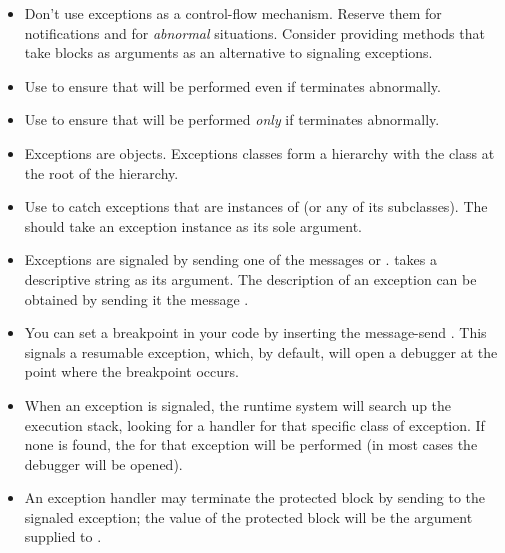 \documentclass[a4paper,10pt,twoside]{book}
\begin{document}
\begin{itemize}
\item Don't use exceptions as a control-flow mechanism.  Reserve them for notifications and for \emph{abnormal} situations.  Consider providing methods that take blocks as arguments as an alternative to signaling exceptions.

\item Use  to ensure that  will be performed even if  terminates abnormally.

\item Use  to ensure that  will be performed \emph{only} if  terminates abnormally.

\item Exceptions are objects. Exceptions classes form a hierarchy with the class  at the root of the hierarchy.

\item Use  to catch exceptions that are instances of  (or any of its subclasses). The  should take an exception instance as its sole argument.

\item Exceptions are signaled by sending one of the messages  or .  takes a descriptive string as its argument. The description of an exception can be obtained by sending it the message .

\item You can set a breakpoint in your code by inserting the message-send . This signals a resumable  exception, which, by default, will open a debugger at the point where the breakpoint occurs.

\item When an exception is signaled, the runtime system will search up the execution stack, looking for a handler for that specific class of exception. If none is found, the  for that exception will be performed (\ie in most cases the debugger will be opened).

\item An exception handler may terminate the protected block by sending  to the signaled exception; the value of the protected block will be the argument supplied to . 


\end{itemize}
\end{document}
